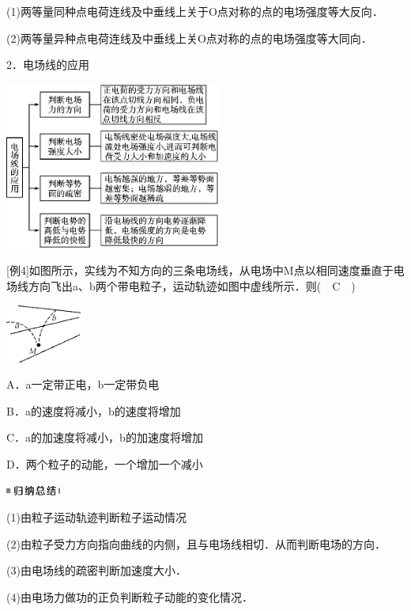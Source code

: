 (1)两等量同种点电荷连线及中垂线上关于O点对称的点的电场强度等大反向．

(2)两等量异种点电荷连线及中垂线上关O点对称的点的电场强度等大同向．

2．电场线的应用

\begin{center}\includegraphics[width=2.8125in,height=2.16667in]{media/image265.png}\end{center}
{[}例4{]}如图所示，实线为不知方向的三条电场线，从电场中M点以相同速度垂直于电场线方向飞出a、b两个带电粒子，运动轨迹如图中虚线所示．则(　C　)

\begin{center}\includegraphics[width=0.97917in,height=0.75in]{media/image266.png}\end{center}

A．a一定带正电，b一定带负电

B．a的速度将减小，b的速度将增加

C．a的加速度将减小，b的加速度将增加

D．两个粒子的动能，一个增加一个减小

\begin{center}\includegraphics[width=0.70833in,height=0.125in]{media/image13.png}\end{center}

(1)由粒子运动轨迹判断粒子运动情况

(2)由粒子受力方向指向曲线的内侧，且与电场线相切．从而判断电场的方向．

(3)由电场线的疏密判断加速度大小．

(4)由电场力做功的正负判断粒子动能的变化情况．

